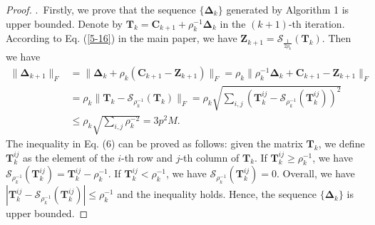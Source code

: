 \vspace{-6mm}
\begin{proof}
$ $.\ Firstly, we prove that the sequence $\{\bm{\Delta}_{k}\}$ generated by Algorithm 1 is upper bounded. Denote by $\bm{T}_{k}=\bm{C}_{k+1}+\rho_{k}^{-1}\bm{\Delta}_{k}$ in the $(k+1)$-th iteration. According to Eq. (\ref{5-16}) in the main paper, we have $\bm{Z}_{k+1}=\mathcal{S}_{\frac{1}{2\rho_{k}}}(\bm{T}_{k})$. 
Then we have 
\begin{align}
\|
\bm{\Delta}_{k+1}
\|_{F}
&
=
\|
\bm{\Delta}_{k}
+
\rho_{k}
(\bm{C}_{k+1}-\bm{Z}_{k+1})
\|_{F}
=
\rho_{k}\|
\rho_{k}^{-1}
\bm{\Delta}_{k}
+
\bm{C}_{k+1}
-
\bm{Z}_{k+1}
\|_{F}
\\
&
=
\rho_{k}\|
\bm{T}_{k}
-
\mathcal{S}_{\rho_{k}^{-1}}(\bm{T}_{k})
\|_{F}
=
\rho_{k}
\sqrt{\sum_{i,j}(\bm{T}_{k}^{ij}-\mathcal{S}_{\rho_{k}^{-1}}(\bm{T}_{k}^{ij}))^{2}}
\\
&
\le
\rho_{k}
\sqrt{\sum_{i,j}\rho_{k}^{-2}}
=
3p^2M.
\end{align}
The inequality in Eq. (6) can be proved as follows: given the matrix $\bm{T}_{k}$, we define $\bm{T}_{k}^{ij}$ as the element of the $i$-th row and $j$-th column of $\bm{T}_{k}$. If $\bm{T}_{k}^{ij}\ge\rho_{k}^{-1}$, we have $\mathcal{S}_{\rho_{k}^{-1}}(\bm{T}_{k}^{ij})=\bm{T}_{k}^{ij}-\rho_{k}^{-1}$. If $\bm{T}_{k}^{ij}<\rho_{k}^{-1}$, we have $\mathcal{S}_{\rho_{k}^{-1}}(\bm{T}_{k}^{ij})=0$. Overall, we have $|\bm{T}_{k}^{ij}-\mathcal{S}_{\rho_{k}^{-1}}(\bm{T}_{k}^{ij})|\le\rho_{k}^{-1}$ and the inequality holds. Hence, the sequence $\{\bm{\Delta}_{k}\}$ is upper bounded.


\end{proof}
